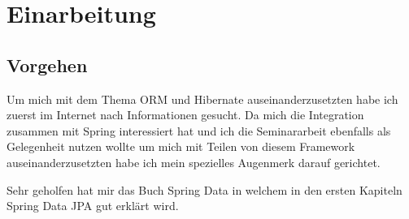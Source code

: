\chapter{Einarbeitung}
\label{sec:Einarbeitung}

\section{Vorgehen}
Um mich mit dem Thema ORM und Hibernate auseinanderzusetzten habe ich zuerst im Internet nach Informationen gesucht. Da mich die Integration zusammen mit Spring interessiert hat und ich die Seminararbeit ebenfalls als Gelegenheit nutzen wollte um mich mit Teilen von diesem Framework auseinanderzusetzten habe ich mein spezielles Augenmerk darauf gerichtet.

Sehr geholfen hat mir das Buch Spring Data \cite{SpringData} in welchem in den ersten Kapiteln Spring Data JPA gut erklärt wird.
